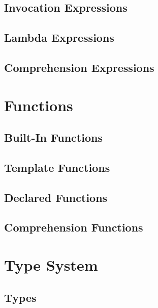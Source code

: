 \documentclass[a4paper,oneside,12pt, extrafontsizes]{memoir}
\begin{document}
  \chapter{Invocation Expressions}
  \label{ch:invocations}
  

  \chapter{Lambda Expressions}
  \label{ch:lambdas}
  

  \chapter{Comprehension Expressions}
  \label{ch:comprehensions}
  

\part{Functions}

  \chapter{Built-In Functions}
  \label{ch:built-in-functions}
  

  \chapter{Template Functions}
  \label{ch:template-functions}
  

  \chapter{Declared Functions}
  \label{ch:declared-functions}
  

  \chapter{Comprehension Functions}
  \label{ch:comprehension-functions}
  

\part{Type System}

  \chapter{Types}
  \label{ch:types}
  
\end{document}
